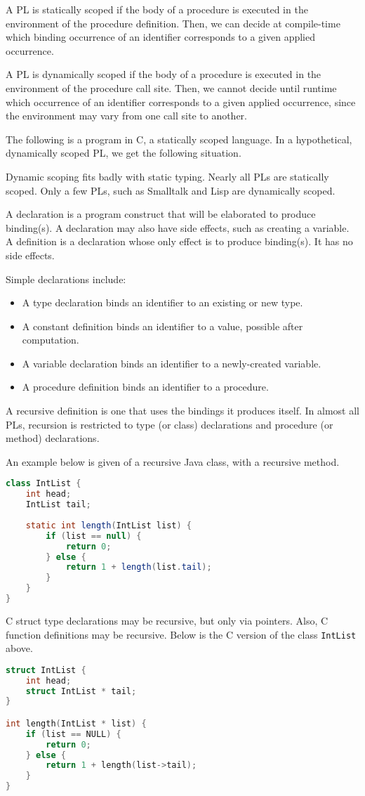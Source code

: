 \documentclass[a4paper, openany]{memoir}
\begin{document}
A PL is statically scoped if the body of a procedure is executed in the environment of the procedure definition. Then, we can decide at compile-time which binding occurrence of an identifier corresponds to a given applied occurrence. 

A PL is dynamically scoped if the body of a procedure is executed in the environment of the procedure call site. Then, we cannot decide until runtime which occurrence of an identifier corresponds to a given applied occurrence, since the environment may vary from one call site to another.

The following is a program in C, a statically scoped language.
In a hypothetical, dynamically scoped PL, we get the following situation.

Dynamic scoping fits badly with static typing. Nearly all PLs are statically scoped. Only a few PLs, such as Smalltalk and Lisp are dynamically scoped.

A declaration is a program construct that will be elaborated to produce binding(s). A declaration may also have side effects, such as creating a variable. A definition is a declaration whose only effect is to produce binding(s). It has no side effects.

Simple declarations include:
\begin{itemize}
    \item A type declaration binds an identifier to an existing or new type.
    \item A constant definition binds an identifier to a value, possible after computation.
    \item A variable declaration binds an identifier to a newly-created variable.
    \item A procedure definition binds an identifier to a procedure.
\end{itemize}

A recursive definition is one that uses the bindings it produces itself. In almost all PLs, recursion is restricted to type (or class) declarations and procedure (or method) declarations. 

An example below is given of a recursive Java class, with a recursive method.
\begin{lstlisting}[language=Java]
class IntList {
    int head;
    IntList tail;
    
    static int length(IntList list) {
        if (list == null) {
            return 0;
        } else {
            return 1 + length(list.tail);
        }
    }
}
\end{lstlisting}
C struct type declarations may be recursive, but only via pointers. Also, C function definitions may be recursive. Below is the C version of the class \texttt{IntList} above.
\begin{lstlisting}[language=C]
struct IntList {
    int head;
    struct IntList * tail;
}

int length(IntList * list) {
    if (list == NULL) {
        return 0;
    } else {
        return 1 + length(list->tail);
    }
}
\end{lstlisting}
\end{document}
